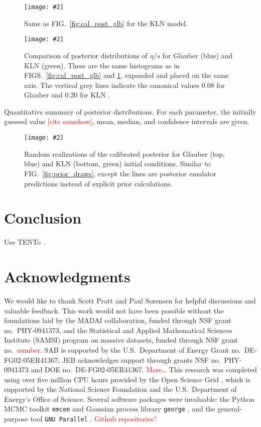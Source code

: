 \documentclass[aps,prc,reprint,superscriptaddress,amsmath]{revtex4-1}
\newcommand{\todo}[1]{\textcolor{red}{#1}}
\newcommand{\colfig}[3][t]{
  \begin{figure}[#1]
    \texttt{[image: \#2]}
    \caption{\label{fig:#2}#3}
  \end{figure}
}
\newcommand{\widefig}[3][t]{
  \begin{figure*}[#1]
    \texttt{[image: \#2]}
    \caption{\label{fig:#2}#3}
  \end{figure*}
}
\newcommand{\trento}{T\raisebox{-.5ex}{R}ENTo}
\begin{document}
\widefig{cal_post_kln}{
  Same as FIG.~\ref{fig:cal_post_glb} for the KLN model.
}

\colfig{post_compare}{
  Comparison of posterior distributions of $\eta/s$ for Glauber (blue) and KLN (green).
  These are the same histograms as in FIGS.~\ref{fig:cal_post_glb} and \ref{fig:cal_post_kln}, expanded and placed on the same axis.
  The vertical grey lines indicate the canonical values 0.08 for Glauber and 0.20 for KLN \cite{}.
}

\begin{table*}
  \caption{
    \label{tab:posterior}
    Quantitative summary of posterior distributions.
    For each parameter, the initially guessed value \todo{[cite somehow]}, mean, median, and confidence intervals are given.
  }
  
\end{table*}

\widefig{post_draws}{
  Random realizations of the calibrated posterior for Glauber (top, blue) and KLN (bottom, green) initial conditions.
  Similar to FIG.~\ref{fig:prior_draws},
  except the lines are posterior emulator predictions instead of explicit prior calculations.
}



\section{Conclusion}

Use \trento\ \cite{Moreland:2014oya}.


\section*{Acknowledgments}

We would like to thank Scott Pratt and Paul Sorensen for helpful discussions and valuable feedback.
This work would not have been possible without the foundations laid by the MADAI collaboration, funded through NSF grant no.~PHY-0941373, and the Statistical and Applied Mathematical Sciences Institute (SAMSI) program on massive datasets, funded through NSF grant no.~\todo{number}.
SAB is supported by the U.S.\ Department of Energy Grant no.~DE-FG02-05ER41367; JEB acknowledges support through grants NSF no.~PHY-0941373 and DOE no.~DE-FG02-05ER41367.
\todo{More\ldots}
This research was completed using over five million CPU hours provided by the Open Science Grid \cite{Pordes:2007zzb,Sfiligoi:2010zz}, which is supported by the National Science Foundation and the U.S.\ Department of Energy's Office of Science.
Several software packages were invaluable:
the Python MCMC toolkit \texttt{emcee} \cite{FM:2013mc} and Gaussian process library \texttt{george} \cite{Ambikasaran:2014gp}, and the general-purpose tool \texttt{GNU Parallel} \cite{Tange:2011pa}.
\todo{Github repositories?}
\end{document}
